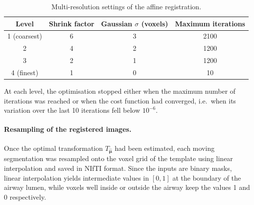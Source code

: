 \begin{table}[htbp]              %
  \centering                     %
  \caption{Multi-resolution settings of the affine registration.}
  \label{tab:multires}           %
  \begin{tabular}{cccc}          %
    \toprule
    Level & Shrink factor & Gaussian $\sigma$ (voxels) & Maximum iterations \\
    \midrule
    1 (coarsest) & 6 & 3 & 2100 \\
    2            & 4 & 2 & 1200 \\
    3            & 2 & 1 & 1200 \\
    4 (finest)   & 1 & 0 & 10   \\
    \bottomrule
  \end{tabular}
\end{table}

At each level, the optimisation stopped either when the maximum number of
iterations was reached or when the cost function had converged, i.e.\ when its
variation over the last 10 iterations fell below $10^{-6}$.

\paragraph{Resampling of the registered images.}  %

Once the optimal transformation $T_{\hat{\boldsymbol{\mu}}}$ had been estimated,
each moving segmentation was resampled onto the voxel grid of the template using
linear interpolation and saved in NIfTI format. Since the inputs are binary
masks, linear interpolation yields intermediate values in $[0,1]$ at the
boundary of the airway lumen, while voxels well inside or outside the airway
keep the values 1 and 0 respectively.




